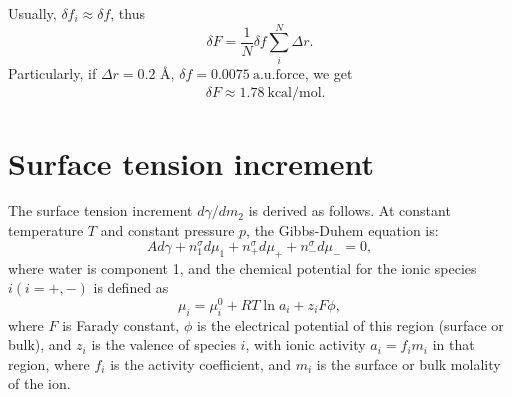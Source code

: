 Usually, $\delta{f_i}\approx\delta{f}$, thus
\begin{equation}
  \delta{F} = \frac{1}{N}\delta{f}\sum_{i}^{N}{\Delta{r}}.
\label{eq:dleta_f-2}
\end{equation}
Particularly, if $\Delta{r}= 0.2$ \AA, $\delta{f}=0.0075\ \text{a.u.force}$, we get 
\begin{equation}
\begin{split}
  &\delta{F} \approx 1.78\ \text{kcal/mol}.\nonumber
\end{split}
\label{eq:dleta_f-3}
\end{equation}

%

\section{Surface tension increment}\label{surface_tension_increment}
The surface tension increment $d\gamma/{dm_2}$ is derived as follows.
At constant temperature $T$ and constant pressure $p$, the Gibbs-Duhem equation is\cite{Pegram2006}:
\begin{equation}
Ad\gamma+n_1^{\sigma}d\mu_1 + {n_+^{\sigma}d\mu_+} + {n_-^{\sigma}d\mu_-} =0,
\label{eq:GD}
\end{equation}
where water is component 1, and the chemical potential for the ionic species $i(i=+,-)$ is defined as 
\begin{equation}
\mu_i =\mu_i^0+RT\ln{a}_i+z_iF\phi,
\label{eq:GDb}
\end{equation}
where $F$ is Farady constant, $\phi$ is the electrical potential of this region (surface or bulk), and $z_i$ is the valence of species $i$, with ionic 
activity $a_i=f_im_i$ in that region, where $f_i$ is the activity coefficient, and $m_i$ is the surface or bulk molality of the ion.

